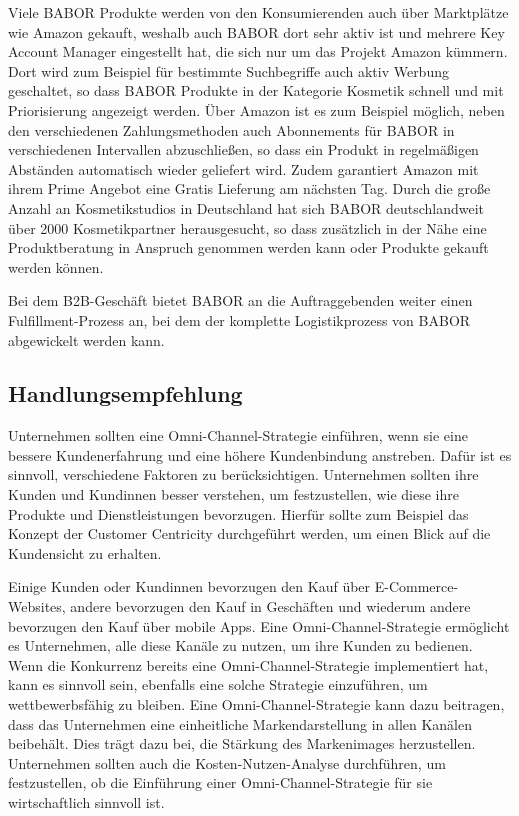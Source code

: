 Viele BABOR Produkte werden von den Konsumierenden auch über Marktplätze wie Amazon gekauft, weshalb auch BABOR dort sehr aktiv ist und mehrere Key Account Manager eingestellt hat, die sich nur um das Projekt Amazon kümmern. Dort wird zum Beispiel für bestimmte Suchbegriffe auch aktiv Werbung geschaltet, so dass BABOR Produkte in der Kategorie Kosmetik schnell und mit Priorisierung angezeigt werden.
\newline
Über Amazon ist es zum Beispiel möglich, neben den verschiedenen Zahlungsmethoden auch Abonnements für BABOR in verschiedenen Intervallen abzuschließen, so dass ein Produkt in regelmäßigen Abständen automatisch wieder geliefert wird. Zudem garantiert Amazon mit ihrem Prime Angebot eine Gratis Lieferung am nächsten Tag. Durch die große Anzahl an Kosmetikstudios in Deutschland hat sich BABOR deutschlandweit über 2000 Kosmetikpartner herausgesucht, so dass zusätzlich in der Nähe eine Produktberatung in Anspruch genommen werden kann oder Produkte gekauft werden können.
\newline

Bei dem B2B-Geschäft bietet BABOR an die Auftraggebenden weiter einen Fulfillment-Prozess an, bei dem der komplette Logistikprozess von BABOR abgewickelt werden kann.

\subsection{Handlungsempfehlung}\label{hauptabschnitt_5_2}
Unternehmen sollten eine Omni-Channel-Strategie einführen, wenn sie eine bessere Kundenerfahrung und eine höhere Kundenbindung anstreben. Dafür ist es sinnvoll, verschiedene Faktoren zu berücksichtigen.
Unternehmen sollten ihre Kunden und Kundinnen besser verstehen, um festzustellen, wie diese ihre Produkte und Dienstleistungen bevorzugen. Hierfür sollte zum Beispiel das Konzept der Customer Centricity durchgeführt werden, um einen Blick auf die Kundensicht zu erhalten.
\newline

Einige Kunden oder Kundinnen bevorzugen den Kauf über E-Commerce-Websites, andere bevorzugen den Kauf in Geschäften und wiederum andere bevorzugen den Kauf über mobile Apps. Eine Omni-Channel-Strategie ermöglicht es Unternehmen, alle diese Kanäle zu nutzen, um ihre Kunden zu bedienen. Wenn die Konkurrenz bereits eine Omni-Channel-Strategie implementiert hat, kann es sinnvoll sein, ebenfalls eine solche Strategie einzuführen, um wettbewerbsfähig zu bleiben. Eine Omni-Channel-Strategie kann dazu beitragen, dass das Unternehmen eine einheitliche Markendarstellung in allen Kanälen beibehält. Dies trägt dazu bei, die Stärkung des Markenimages herzustellen. Unternehmen sollten auch die Kosten-Nutzen-Analyse durchführen, um festzustellen, ob die Einführung einer Omni-Channel-Strategie für sie wirtschaftlich sinnvoll ist.
\newline


